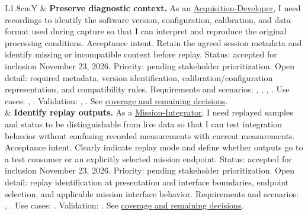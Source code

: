 \begin{tabularx}{\linewidth}{L{1.8cm}Y}
 & \textbf{Preserve diagnostic context.} As an \hyperref[Stakeholder:Acquisition-Developer]{Acquisition-Developer}, I need recordings to identify the software version, configuration, calibration, and data format used during capture so that I can interpret and reproduce the original processing conditions. Acceptance intent. Retain the agreed session metadata and identify missing or incompatible context before replay. Status: accepted for inclusion November 23, 2026. Priority: pending stakeholder prioritization. Open detail: required metadata, version identification, calibration/configuration representation, and compatibility rules. Requirements and scenarios: , , , . Use cases: , . Validation: , . See \hyperref[Section:RecordingPlaybackTraceGaps]{coverage and remaining decisions}.\\
 & \textbf{Identify replay outputs.} As a \hyperref[Stakeholder:Mission-Integrator]{Mission-Integrator}, I need replayed samples and status to be distinguishable from live data so that I can test integration behavior without confusing recorded measurements with current measurements. Acceptance intent. Clearly indicate replay mode and define whether outputs go to a test consumer or an explicitly selected mission endpoint. Status: accepted for inclusion November 23, 2026. Priority: pending stakeholder prioritization. Open detail: replay identification at presentation and interface boundaries, endpoint selection, and applicable mission interface behavior. Requirements and scenarios: , . Use cases: . Validation: . See \hyperref[Section:RecordingPlaybackTraceGaps]{coverage and remaining decisions}.\\
\end{tabularx}
\normalsize
